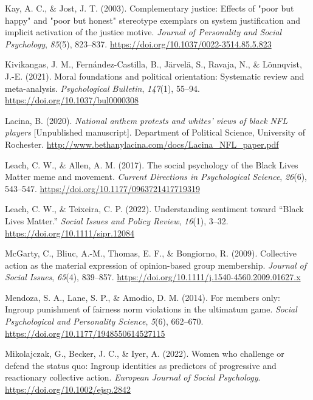 \documentclass[12pt, letterpaper]{article}
\newenvironment{CSLReferences}[2]{}{}
\begin{document}
\begin{CSLReferences}{1}{0}
\leavevmode{}%
Kay, A. C., \& Jost, J. T. (2003). Complementary justice: Effects of
"poor but happy" and "poor but honest" stereotype exemplars on system
justification and implicit activation of the justice motive.
\emph{Journal of Personality and Social Psychology}, \emph{85}(5),
823--837. \url{https://doi.org/10.1037/0022-3514.85.5.823}

\leavevmode{}%
Kivikangas, J. M., Fernández-Castilla, B., Järvelä, S., Ravaja, N., \&
Lönnqvist, J.-E. (2021). Moral foundations and political orientation:
{Systematic} review and meta-analysis. \emph{Psychological Bulletin},
\emph{147}(1), 55--94. \url{https://doi.org/10.1037/bul0000308}

\leavevmode{}%
Lacina, B. (2020). \emph{National anthem protests and whites' views of
black NFL players} {[}Unpublished manuscript{]}. Department of Political
Science, University of Rochester.
\url{http://www.bethanylacina.com/docs/Lacina_NFL_paper.pdf}

\leavevmode{}%
Leach, C. W., \& Allen, A. M. (2017). The social psychology of the
{Black Lives Matter} meme and movement. \emph{Current Directions in
Psychological Science}, \emph{26}(6), 543--547.
\url{https://doi.org/10.1177/0963721417719319}

\leavevmode{}%
Leach, C. W., \& Teixeira, C. P. (2022). Understanding sentiment toward
{``{Black Lives Matter}.''} \emph{Social Issues and Policy Review},
\emph{16}(1), 3--32. \url{https://doi.org/10.1111/sipr.12084}

\leavevmode{}%
McGarty, C., Bliuc, A.-M., Thomas, E. F., \& Bongiorno, R. (2009).
Collective action as the material expression of opinion-based group
membership. \emph{Journal of Social Issues}, \emph{65}(4), 839--857.
\url{https://doi.org/10.1111/j.1540-4560.2009.01627.x}

\leavevmode{}%
Mendoza, S. A., Lane, S. P., \& Amodio, D. M. (2014). For members only:
Ingroup punishment of fairness norm violations in the ultimatum game.
\emph{Social Psychological and Personality Science}, \emph{5}(6),
662--670. \url{https://doi.org/10.1177/1948550614527115}

\leavevmode{}%
Mikolajczak, G., Becker, J. C., \& Iyer, A. (2022). Women who challenge
or defend the status quo: {Ingroup} identities as predictors of
progressive and reactionary collective action. \emph{European Journal of
Social Psychology}. \url{https://doi.org/10.1002/ejsp.2842}


\end{CSLReferences}
\end{document}

